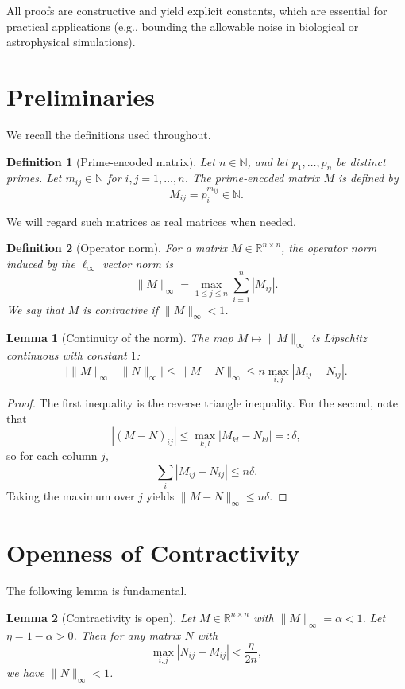 \documentclass[12pt,a4paper]{article}
\newtheorem{lemma}{Lemma}
\newtheorem{definition}{Definition}
\begin{document}
All proofs are constructive and yield explicit constants, which are essential for practical applications (e.g., bounding the allowable noise in biological or astrophysical simulations).

\section{Preliminaries}

We recall the definitions used throughout.

\begin{definition}[Prime‐encoded matrix]
Let $n \in \mathbb{N}$, and let $p_1,\ldots,p_n$ be distinct primes. Let $m_{ij} \in \mathbb{N}$ for $i,j=1,\ldots,n$. The \emph{prime‐encoded matrix} $M$ is defined by
\[
M_{ij} = p_i^{m_{ij}} \in \mathbb{N}.
\]
\end{definition}

We will regard such matrices as real matrices when needed.

\begin{definition}[Operator norm]
For a matrix $M \in \mathbb{R}^{n \times n}$, the operator norm induced by the $\ell_\infty$ vector norm is
\[
\|M\|_\infty = \max_{1 \le j \le n} \sum_{i=1}^n |M_{ij}|.
\]
We say that $M$ is \emph{contractive} if $\|M\|_\infty < 1$.
\end{definition}

\begin{lemma}[Continuity of the norm]
The map $M \mapsto \|M\|_\infty$ is Lipschitz continuous with constant $1$:
\[
\bigl|\|M\|_\infty - \|N\|_\infty\bigr| \le \|M - N\|_\infty \le n \max_{i,j} |M_{ij} - N_{ij}|.
\]
\end{lemma}

\begin{proof}
The first inequality is the reverse triangle inequality. For the second, note that
\[
| (M-N)_{ij} | \le \max_{k,l} |M_{kl} - N_{kl}| =: \delta,
\]
so for each column $j$,
\[
\sum_i |M_{ij} - N_{ij}| \le n \delta.
\]
Taking the maximum over $j$ yields $\|M-N\|_\infty \le n \delta$.
\end{proof}

\section{Openness of Contractivity}

The following lemma is fundamental.

\begin{lemma}[Contractivity is open]
Let $M \in \mathbb{R}^{n \times n}$ with $\|M\|_\infty = \alpha < 1$. Let $\eta = 1 - \alpha > 0$. Then for any matrix $N$ with
\[
\max_{i,j} |N_{ij} - M_{ij}| < \frac{\eta}{2n},
\]
we have $\|N\|_\infty < 1$.
\end{lemma}
\end{document}
